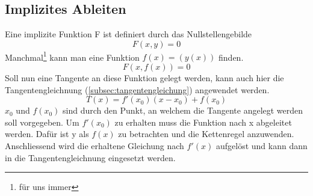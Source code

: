 \subsection{Implizites Ableiten}
Eine implizite Funktion F ist definiert durch das Nullstellengebilde 
\[ F(x,y) = 0 \]
Manchmal\footnote{für uns immer} kann man eine Funktion $f(x) = (y(x))$ finden. 
\[ F(x, f(x)) = 0 \]
Soll nun eine Tangente an diese Funktion gelegt werden, kann auch hier die Tangentengleichnung (\ref{subsec:tangentengleichung}) angewendet werden. 
\[ T(x) = f'(x_0)(x - x_0) + f(x_0) \]
$x_0$ und $f(x_0)$ sind durch den Punkt, an welchem die Tangente angelegt werden soll vorgegeben. Um $f'(x_0)$ zu erhalten muss die Funktion nach x abgeleitet werden. Dafür ist y als $f(x)$ zu betrachten und die Kettenregel anzuwenden. Anschliessend wird die erhaltene Gleichung nach $f'(x)$ aufgelöst und kann dann in die Tangentengleichnung eingesetzt werden. 



